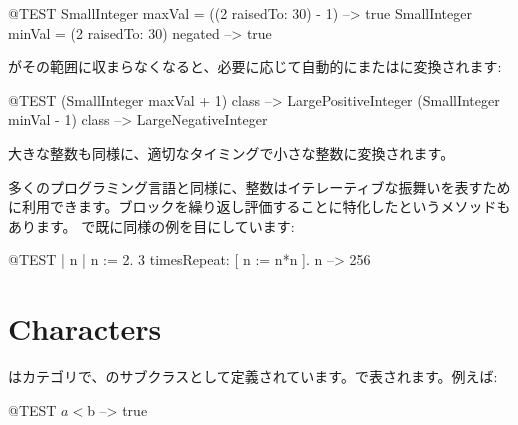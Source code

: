 \documentclass[a4paper,10pt,twoside]{book}
\begin{document}
\begin{code}{@TEST}
SmallInteger maxVal = ((2 raisedTo: 30) - 1)      --> true
SmallInteger minVal = (2 raisedTo: 30) negated --> true
\end{code}

がその範囲に収まらなくなると、必要に応じて自動的にまたはに変換されます:

\begin{code}{@TEST}
(SmallInteger maxVal + 1) class --> LargePositiveInteger
(SmallInteger minVal - 1) class  --> LargeNegativeInteger
\end{code}

大きな整数も同様に、適切なタイミングで小さな整数に変換されます。

多くのプログラミング言語と同様に、整数はイテレーティブな振舞いを表すために利用できます。ブロックを繰り返し評価することに特化したというメソッドもあります。
で既に同様の例を目にしています:
\begin{code}{@TEST | n |}
n := 2.
3 timesRepeat: [ n := n*n ].
n --> 256
\end{code}

\section{Characters}

はカテゴリで、のサブクラスとして定義されています。で表されます。例えば:

\begin{code}{@TEST}
$a < $b --> true
\end{code}
\end{document}

